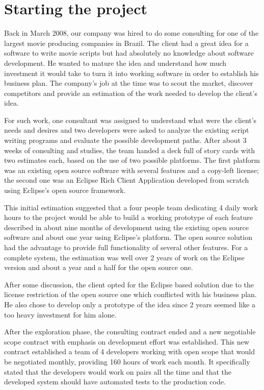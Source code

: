 \documentclass[lnbip]{svmultln}
\begin{document}
\section{Starting the project}
\label{sec:start}

Back in March 2008, our company was hired to do some consulting for
one of the largest movie producing companies in Brazil. The client had
a great idea for a software to write movie scripts but had absolutely
no knowledge about software development.  He wanted to mature the idea
and understand how much investment it would take to turn it into
working software in order to establish his business plan. The
company's job at the time was to scout the market, discover
competitors and provide an estimation of the work needed to develop
the client's idea.

For such work, one consultant was assigned to understand what were the
client's needs and desires and two developers were asked to analyze
the existing script writing programs and evaluate the possible
development paths. After about 3 weeks of consulting and studies, the
team handed a deck full of story cards with two estimates each, based
on the use of two possible platforms. The first platform was an
existing open source software with several features and a copy-left
license; the second one was an Eclipse Rich Client Application
developed from scratch using Eclipse's open source framework.

This initial estimation suggested that a four people team dedicating 4
daily work hours to the project would be able to build a working
prototype of each feature described in about nine months of
development using the existing open source software and about one year
using Eclipse's platform. The open source solution had the advantage
to provide full functionality of several other features. For a
complete system, the estimation was well over 2 years of work on the
Eclipse version and about a year and a half for the open source one.

After some discussion, the client opted for the Eclipse based solution
due to the license restriction of the open source one which conflicted
with his business plan. He also chose to develop only a prototype of
the idea since 2 years seemed like a too heavy investment for him
alone.

After the exploration phase, the consulting contract ended and a new
negotiable scope contract\cite{tem citação pra esse tipo de contrato?}
with emphasis on development effort was established. This new contract
established a team of 4 developers working with open scope that would
be negotiated monthly, providing 160 hours of work each month. It
specifically stated that the developers would work on pairs all the
time and that the developed system should have automated tests to the
production code.
\end{document}
